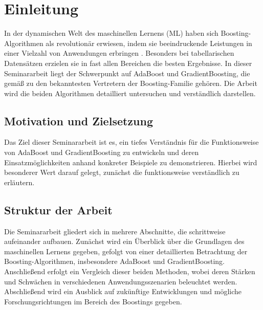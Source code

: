 \section{Einleitung}

In der dynamischen Welt des maschinellen Lernens (ML) haben sich Boosting-Algorithmen als revolutionär erwiesen, indem sie beeindruckende Leistungen in einer Vielzahl von Anwendungen erbringen \parencite[Kapitel 1.1.2]{SchapireFreund2012}. Besonders bei tabellarischen Datensätzen erzielen sie in fast allen Bereichen die besten Ergebnisse. 
\newline
In dieser Seminararbeit liegt der Schwerpunkt auf AdaBoost und GradientBoosting, die gemäß \textcite[S.~192]{Geron2018} zu den bekanntesten Vertretern der Boosting-Familie gehören. Die Arbeit wird die beiden Algorithmen detailliert untersuchen und verständlich darstellen.

\subsection{Motivation und Zielsetzung}

Das Ziel dieser Seminararbeit ist es, ein tiefes Verständnis für die Funktionsweise von AdaBoost und GradientBoosting zu entwickeln und deren Einsatzmöglichkeiten anhand konkreter Beispiele zu demonstrieren. Hierbei wird besonderer Wert darauf gelegt, zunächst die funktionsweise verständlich zu erläutern.

\subsection{Struktur der Arbeit}

Die Seminararbeit gliedert sich in mehrere Abschnitte, die schrittweise aufeinander aufbauen. Zunächst wird ein Überblick über die Grundlagen des maschinellen Lernens gegeben, gefolgt von einer detaillierten Betrachtung der Boosting-Algorithmen, insbesondere AdaBoost und GradientBoosting. Anschließend erfolgt ein Vergleich dieser beiden Methoden, wobei deren Stärken und Schwächen in verschiedenen Anwendungsszenarien beleuchtet werden. Abschließend wird ein Ausblick auf zukünftige Entwicklungen und mögliche Forschungsrichtungen im Bereich des Boostings gegeben.



\cite[text]{Frochte2020}
\cite[text]{SchapireFreund2012}
\cite[text]{Geron2018}
\cite[text]{James2023}
\cite[text]{Hastie2009}